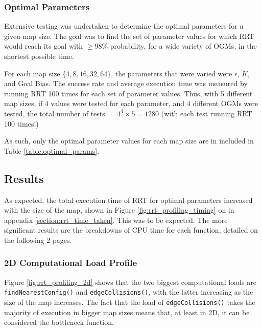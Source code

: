     \subsubsection{Optimal Parameters}
    \label{section:rrt_optimal_params}
        Extensive testing was undertaken to determine the optimal parameters for a given map size. The goal was to find the set of parameter values for which \gls{RRT} would reach its goal with $\geq98\%$ probability, for a wide variety of \glspl{OGM}, in the shortest possible time. 

        For each map size $\{4, 8, 16, 32, 64\}$, the parameters that were varied were $\epsilon$, $K$, and Goal Bias. The success rate and average execution time was measured by running \gls{RRT} 100 times for each set of parameter values. Thus, with 5 different map sizes, if 4 values were tested for each parameter, and 4 different \glspl{OGM} were tested, the total number of tests $= 4^4 \times 5 = 1280$ (with each test running \gls{RRT} 100 times!)

        As such, only the optimal parameter values for each map size are in included in Table \ref{table:optimal_params}.

        

\subsection{Results}
\label{section:rrt_analysis_results}
    As expected, the total execution time of \gls{RRT} for optimal parameters increased with the size of the map, shown in Figure \ref{fig:rrt_profiling_timing} on in appendix \ref{section:rrt_time_taken}. This was to be expected. The more significant results are the breakdowns of CPU time for each function, detailed on the following 2 pages.
    \newpage
    \subsubsection{2D Computational Load Profile}
        Figure \ref{fig:rrt_profiling_2d} shows that the two biggest computational loads are \texttt{findNearestConfig()} and \texttt{edgeCollisions()}, with the latter increasing as the size of the map increases. The fact that the load of \texttt{edgeCollisions()} takes the majority of execution in bigger map sizes means that, at least in 2D, it can be considered the bottleneck function.

        
 \newpage
